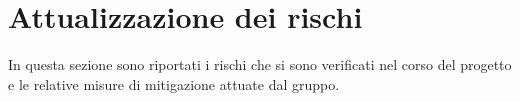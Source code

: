 \section{Attualizzazione dei rischi}
In questa sezione sono riportati i rischi che si sono verificati nel corso del progetto e le relative misure di mitigazione attuate dal gruppo.